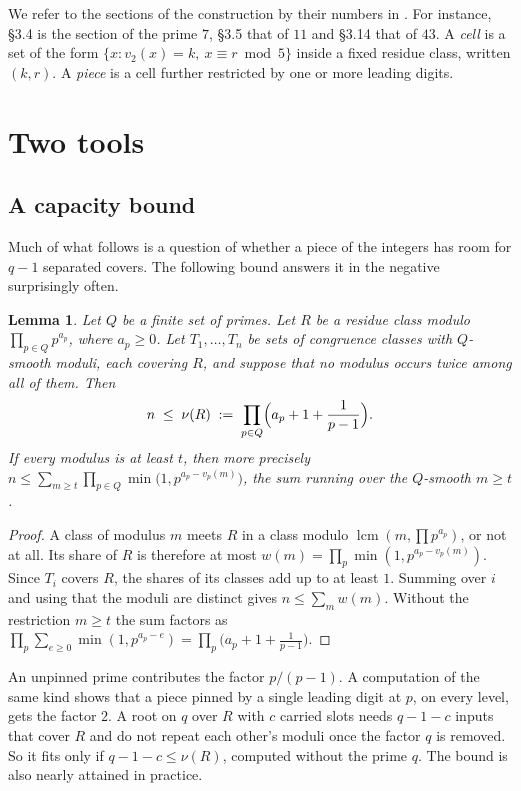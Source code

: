 \documentclass[11pt]{amsart}
\newtheorem{lemma}[theorem]{Lemma}
\theoremstyle{definition}
\theoremstyle{remark}
\begin{document}
We refer to the sections of the construction by their numbers in \cite{Owens14}. For instance, §3.4 is the section of
the prime $7$, §3.5 that of $11$ and §3.14 that of $43$. A \emph{cell} is a set of the form
$\{x : v_2(x)=k,\ x\equiv r \bmod 5\}$ inside a fixed residue class, written $(k,r)$. A \emph{piece} is a cell further
restricted by one or more leading digits.

\section{Two tools}\label{sec:tools}

\subsection{A capacity bound}\label{sec:capacity}

Much of what follows is a question of whether a piece of the integers has room for $q-1$ separated covers. The
following bound answers it in the negative surprisingly often.

\begin{lemma}\label{lem:capacity}
Let $Q$ be a finite set of primes. Let $R$ be a residue class modulo $\prod_{p\in Q}p^{a_p}$, where $a_p\ge0$. Let
$T_1,\dots,T_n$ be sets of congruence classes with $Q$-smooth moduli, each covering $R$, and suppose that no modulus
occurs twice among all of them. Then
\[
n \;\le\; \nu(R) \;:=\; \prod_{p\in Q}\Bigl(a_p+1+\frac{1}{p-1}\Bigr).
\]
If every modulus is at least $t$, then more precisely
$n\le\sum_{m\ge t}\prod_{p\in Q}\min\bigl(1,p^{a_p-v_p(m)}\bigr)$, the sum running over the $Q$-smooth $m\ge t$.
\end{lemma}

\begin{proof}
A class of modulus $m$ meets $R$ in a class modulo $\operatorname{lcm}(m,\prod p^{a_p})$, or not at all. Its share of
$R$ is therefore at most $w(m)=\prod_p \min(1,p^{a_p-v_p(m)})$. Since $T_i$ covers $R$, the shares of its classes add
up to at least $1$. Summing over $i$ and using that the moduli are distinct gives $n\le\sum_m w(m)$. Without the
restriction $m\ge t$ the sum factors as
$\prod_p\sum_{e\ge0}\min(1,p^{a_p-e})=\prod_p\bigl(a_p+1+\tfrac1{p-1}\bigr)$.
\end{proof}

An unpinned prime contributes the factor $p/(p-1)$. A computation of the same kind shows that a piece pinned by a
single leading digit at $p$, on every level, gets the factor $2$. A root on $q$ over $R$ with $c$ carried slots needs
$q-1-c$ inputs that cover $R$ and do not repeat each other's moduli once the factor $q$ is removed. So it fits only
if $q-1-c\le\nu(R)$, computed without the prime $q$. The bound is also nearly attained in practice.
\end{document}
